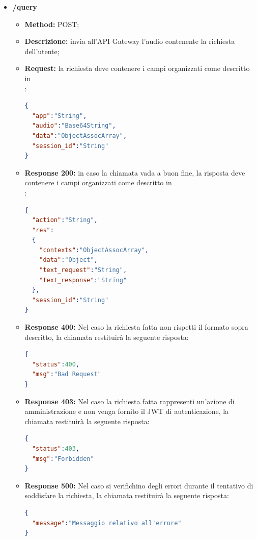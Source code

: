 	\begin{itemize}
		\item \textbf{/query}\\
		\begin{itemize}
			\item \textbf{Method:} POST;
			\item \textbf{Descrizione:} invia all'API Gateway l'audio contenente la richiesta dell'utente;
			\item \textbf{Request:} la richiesta deve contenere i campi organizzati come descritto in \\:
\begin{lstlisting}[language=json,firstnumber=1]
{
  "app":"String",
  "audio":"Base64String",
  "data":"ObjectAssocArray",
  "session_id":"String"
}
\end{lstlisting}
\item \textbf{Response 200:} in caso la chiamata vada a buon fine, la risposta deve contenere i campi organizzati come descritto in \\:
\begin{lstlisting}[language=json,firstnumber=1]
{
  "action":"String",
  "res":
  {
    "contexts":"ObjectAssocArray",
    "data":"Object",
    "text_request":"String",
    "text_response":"String"
  },
  "session_id":"String"
}
\end{lstlisting}
\item \textbf{Response 400:} Nel caso la richiesta fatta non rispetti il formato sopra descritto, la chiamata restituirà la seguente risposta:
\begin{lstlisting}[language=json,firstnumber=1]
{
  "status":400,
  "msg":"Bad Request"
}
\end{lstlisting}
\item \textbf{Response 403:} Nel caso la richiesta fatta rappresenti un'azione di amministrazione e non venga fornito il JWT di autenticazione, la chiamata restituirà la seguente risposta:
\begin{lstlisting}[language=json,firstnumber=1]
{
  "status":403,
  "msg":"Forbidden"
}
\end{lstlisting}
\item \textbf{Response 500:} Nel caso si verifichino degli errori durante il tentativo di soddisfare la richiesta, la chiamata restituirà la seguente risposta:
\begin{lstlisting}[language=json,firstnumber=1]
{
  "message":"Messaggio relativo all'errore"
}
\end{lstlisting}
\end{itemize}
\end{itemize}

